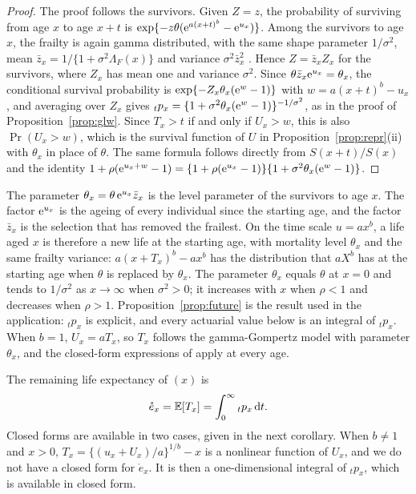 \documentclass[12pt]{article}
\newcommand{\E}{\mathbb{E}}       %
\newcommand{\e}{{\rm e}}         %
\newcommand{\dd}{{\rm d}}        %
\begin{document}
\begin{proof}
The proof follows the survivors. Given $Z=z$, the probability of surviving from age $x$ to age $x+t$ is $\exp\{-z\theta(\e^{a(x+t)^b}-\e^{u_x})\}$. Among the survivors to age $x$, the frailty is again gamma distributed, with the same shape parameter $1/\sigma^2$, mean $\bar z_x=1/\{1+\sigma^2\Lambda_F(x)\}$ and variance $\sigma^2\bar z_x^2$ \citep{vaupel1979impact}. Hence $Z=\bar z_x Z_x$ for the survivors, where $Z_x$ has mean one and variance $\sigma^2$. Since $\theta\bar z_x\e^{u_x}=\theta_x$, the conditional survival probability is $\exp\{-Z_x\theta_x(\e^{w}-1)\}$ with $w=a(x+t)^b-u_x$, and averaging over $Z_x$ gives ${}_tp_x=\{1+\sigma^2\theta_x(\e^{w}-1)\}^{-1/\sigma^2}$, as in the proof of Proposition~\ref{prop:glw}. Since $T_x>t$ if and only if $U_x>w$, this is also $\Pr(U_x>w)$, which is the survival function of $U$ in Proposition~\ref{prop:repr}(ii) with $\theta_x$ in place of $\theta$. The same formula follows directly from $S(x+t)/S(x)$ and the identity $1+\rho(\e^{u_x+w}-1)=\{1+\rho(\e^{u_x}-1)\}\{1+\sigma^2\theta_x(\e^{w}-1)\}$.
\end{proof}

The parameter $\theta_x=\theta\,\e^{u_x}\bar z_x$ is the level parameter of the survivors to age $x$. The factor $\e^{u_x}$ is the ageing of every individual since the starting age, and the factor $\bar z_x$ is the selection that has removed the frailest. On the time scale $u=ax^b$, a life aged $x$ is therefore a new life at the starting age, with mortality level $\theta_x$ and the same frailty variance: $a(x+T_x)^b-ax^b$ has the distribution that $aX^b$ has at the starting age when $\theta$ is replaced by $\theta_x$. The parameter $\theta_x$ equals $\theta$ at $x=0$ and tends to $1/\sigma^2$ as $x\to\infty$ when $\sigma^2>0$; it increases with $x$ when $\rho<1$ and decreases when $\rho>1$. Proposition~\ref{prop:future} is the result used in the application: ${}_tp_x$ is explicit, and every actuarial value below is an integral of ${}_tp_x$. When $b=1$, $U_x=aT_x$, so $T_x$ follows the gamma-Gompertz model with parameter $\theta_x$, and the closed-form expressions of \citet{castellares2024gamma} apply at every age.

The remaining life expectancy of $(x)$ is
\[
\mathring{e}_x=\E[T_x]=\int_0^\infty{}_tp_x\,\dd t.
\]
Closed forms are available in two cases, given in the next corollary. When $b\neq1$ and $x>0$, $T_x=\{(u_x+U_x)/a\}^{1/b}-x$ is a nonlinear function of $U_x$, and we do not have a closed form for $\mathring{e}_x$. It is then a one-dimensional integral of ${}_tp_x$, which is available in closed form.
\end{document}
